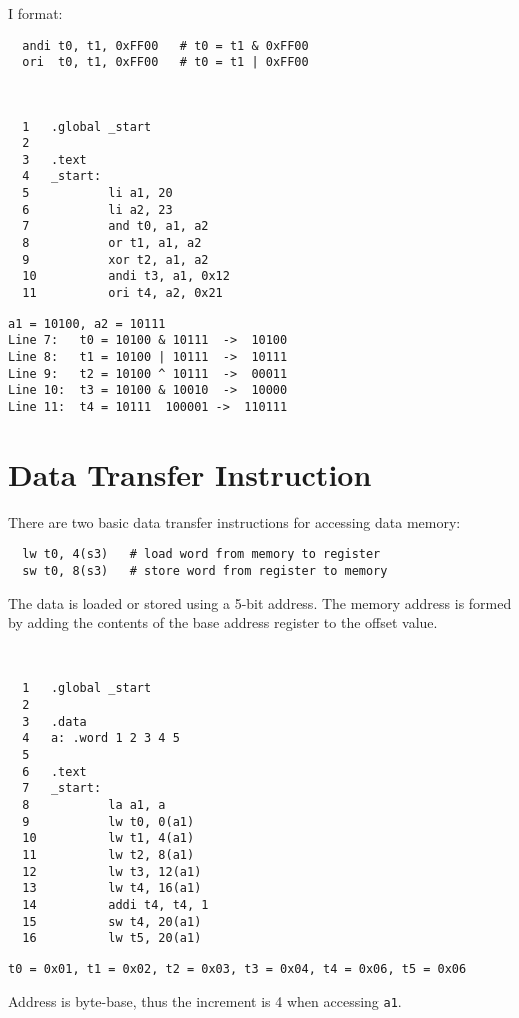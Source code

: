 I format: 
\begin{verbatim}
  andi t0, t1, 0xFF00   # t0 = t1 & 0xFF00
  ori  t0, t1, 0xFF00   # t0 = t1 | 0xFF00
\end{verbatim}

\begin{eg}~
\begin{verbatim}
  1   .global _start
  2
  3   .text
  4   _start:
  5           li a1, 20
  6           li a2, 23
  7           and t0, a1, a2
  8           or t1, a1, a2
  9           xor t2, a1, a2
  10          andi t3, a1, 0x12
  11          ori t4, a2, 0x21
\end{verbatim}

\begin{verbatim}
a1 = 10100, a2 = 10111
Line 7:   t0 = 10100 & 10111  ->  10100
Line 8:   t1 = 10100 | 10111  ->  10111
Line 9:   t2 = 10100 ^ 10111  ->  00011
Line 10:  t3 = 10100 & 10010  ->  10000
Line 11:  t4 = 10111  100001 ->  110111
\end{verbatim}
\end{eg}

\section{Data Transfer Instruction}
There are two basic data transfer instructions for accessing data memory:
\begin{verbatim}
  lw t0, 4(s3)   # load word from memory to register
  sw t0, 8(s3)   # store word from register to memory
\end{verbatim}
The data is loaded or stored using a 5-bit address. The memory address is formed by adding the contents of the base address register to the offset value.

\begin{eg}~
\begin{verbatim}
  1   .global _start
  2
  3   .data
  4   a: .word 1 2 3 4 5
  5
  6   .text
  7   _start:
  8           la a1, a 
  9           lw t0, 0(a1) 
  10          lw t1, 4(a1) 
  11          lw t2, 8(a1) 
  12          lw t3, 12(a1) 
  13          lw t4, 16(a1) 
  14          addi t4, t4, 1
  15          sw t4, 20(a1)
  16          lw t5, 20(a1)
\end{verbatim}

\begin{verbatim}
t0 = 0x01, t1 = 0x02, t2 = 0x03, t3 = 0x04, t4 = 0x06, t5 = 0x06
\end{verbatim}

\begin{remark}
  Address is byte-base, thus the increment is 4 when accessing \verb|a1|. 
\end{remark}
\end{eg}

